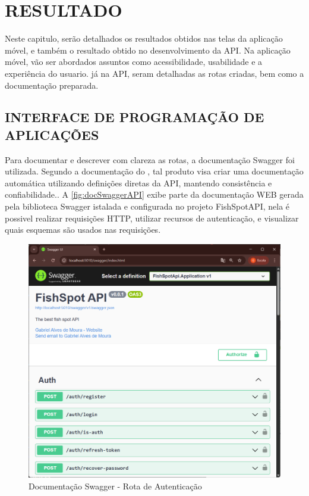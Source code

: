 
\chapter{RESULTADO}
\label{chap:introducao}

Neste capitulo, serão detalhados os resultados obtidos nas telas da aplicação móvel, e também o resultado obtido no desenvolvimento da API. Na aplicação móvel, vão ser abordados assuntos como acessibilidade, usabilidade e a experiência do usuario. já na API, seram detalhadas as rotas criadas, bem como a documentação preparada.

\section{INTERFACE DE PROGRAMAÇÃO DE APLICAÇÕES}
\label{sec:resultadoApi}

Para documentar e descrever com clareza as rotas, a documentação Swagger foi utilizada. Segundo a documentação do , tal produto visa criar uma documentação automática utilizando definições diretas da API, mantendo consistência e confiabilidade.. A \autoref{fig:docSwaggerAPI} exibe parte da documentação WEB gerada pela biblioteca Swagger istalada e configurada no projeto FishSpotAPI, nela é possivel realizar requisições HTTP, utilizar recursos de autenticação, e visualizar quais esquemas são usados nas requisições.

\begin{figure}[H]
    \centering
    \caption{Documentação Swagger - Rota de Autenticação}
    \label{fig:docSwaggerAPI}
    \includegraphics[scale=0.53]{./dados/figuras/api-swagger.png}
\end{figure}

